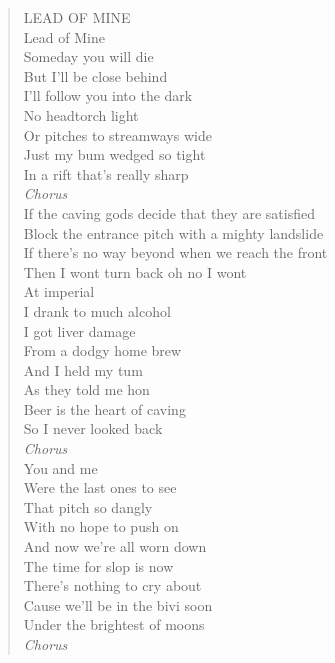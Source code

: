 \begin{verse} \centering
LEAD OF MINE \\
 \vspace{0.3cm}
Lead of Mine \\
Someday you will die \\
But I’ll be close behind \\
I’ll follow you into the dark \\
 \vspace{0.3cm}
No headtorch light \\
Or pitches to streamways wide \\
Just my bum wedged so tight \\
In a rift that’s really sharp \\
  \vspace{0.3cm}
\textit{Chorus}\\
 \vspace{0.3cm}
If the caving gods decide that they are satisfied \\
Block the entrance pitch with a mighty landslide \\
If there’s no way beyond when we reach the front \\
Then I wont turn back oh no I wont \\
  \vspace{0.3cm}
At imperial \\
I drank to much alcohol \\
I got liver damage \\
From a dodgy home brew \\ 
  \vspace{0.3cm}
And I held my tum \\
As they told me hon \\
Beer is the heart of caving \\
So I never looked back \\ 
  \vspace{0.3cm}
\textit{Chorus} \\ 
 \vspace{0.3cm}
You and me \\
Were the last ones to see \\
That pitch so dangly \\
With no hope to push on \\ 
  \vspace{0.3cm}
And now we’re all worn down \\
The time for slop is now \\
There’s nothing to cry about \\
Cause we’ll be in the bivi soon \\
Under the brightest of moons \\ 
  \vspace{0.3cm}
\textit{Chorus} 

\end{verse}

